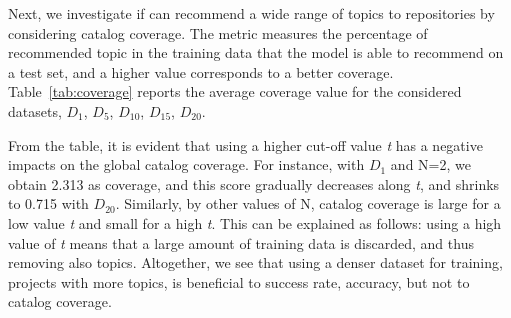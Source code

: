 

Next, we investigate if \TFa can recommend a wide range of topics to repositories by considering catalog coverage. The metric measures the percentage of recommended topic in the training data that the model is able to recommend on a test set, and a higher value corresponds to a better coverage. 
Table~\ref{tab:coverage} reports the average coverage value for the considered datasets, \ie $D_{1}$, $D_{5}$, $D_{10}$, $D_{15}$, $D_{20}$. %


From the table, it is evident that using a higher cut-off value \emph{t} has a negative impacts on the global catalog coverage. For instance, with $D_{1}$ and N=2, we obtain 2.313 as coverage, and this score gradually decreases along \emph{t}, and shrinks to 0.715 with $D_{20}$. Similarly, by other values of N, catalog coverage is large for a low value \emph{t} and small for a high \emph{t}. This can be explained as follows: using a high value of \emph{t} means that a large amount of training data is discarded, and thus removing also topics. Altogether, we see that using a denser dataset for training, \ie projects with more topics, is beneficial to success rate, accuracy, but not to catalog coverage.


